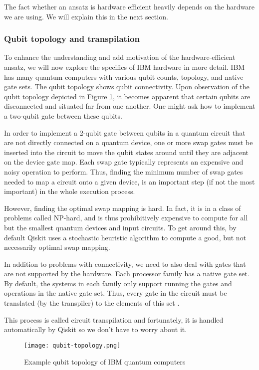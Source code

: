 The fact whether an ansatz is hardware efficient heavily depends on the hardware we are using. We will explain this in the next section.

\subsubsection{Qubit topology and transpilation}
To enhance the understanding and add motivation of the hardware-efficient ansatz, we will now explore the specifics of IBM hardware in more detail. IBM has many quantum computers with various qubit counts, topology, and native gate sets. The qubit topology shows qubit connectivity. Upon observation of the qubit topology depicted in Figure \ref{fig:qubit_topology}, it becomes apparent that certain qubits are disconnected and situated far from one another. One might ask how to implement a two-qubit gate between these qubits.

In order to implement a 2-qubit gate between qubits in a quantum circuit that are not directly connected on a quantum device, one or more swap gates must be inserted into the circuit to move the qubit states around until they are adjacent on the device gate map. Each swap gate typically represents an expensive and noisy operation to perform. Thus, finding the minimum number of swap gates needed to map a circuit onto a given device, is an important step (if not the most important) in the whole execution process.~\cite{transpiler}

However, finding the optimal swap mapping is hard. In fact, it is in a class of problems called NP-hard, and is thus prohibitively expensive to compute for all but the smallest quantum devices and input circuits. To get around this, by default Qiskit uses a stochastic heuristic algorithm to compute a good, but not necessarily optimal swap mapping.~\cite{transpiler} 

In addition to problems with connectivity, we need to also deal with gates that are not supported by the hardware. Each processor family has a native gate set. By default, the systems in each family only support running the gates and operations in the native gate set. Thus, every gate in the circuit must be translated (by the transpiler) to the elements of this set \cite{native_gates}.

This process is called circuit transpilation and fortunately, it is handled automatically by Qiskit so we don't have to worry about it. 
\begin{figure}[H]
    \texttt{[image: qubit-topology.png]}
    \caption{Example qubit topology of IBM quantum computers}
    \label{fig:qubit_topology}
\end{figure}

